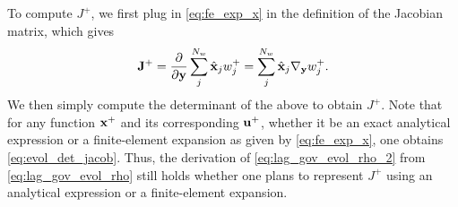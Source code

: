 \documentclass[11pt]{report}
\begin{document}
To compute $J^+$, we first plug in \cref{eq:fe_exp_x} in the definition of the Jacobian matrix, which gives
\begin{equation}
    \mathbf{J}^+ = \frac{\partial}{\partial \mathbf{y}} \sum_j^{N_w} \hat{\mathbf{x}}_j w^+_j = \sum_j^{N_w} \hat{\mathbf{x}}_j \nabla_{\mathbf{y}} w^+_j.
\end{equation}
We then simply compute the determinant of the above to obtain $J^+$. Note that for any function $\mathbf{x}^+$ and its corresponding $\mathbf{u}^+$, whether it be an exact analytical expression or a finite-element expansion as given by \cref{eq:fe_exp_x}, one obtains \cref{eq:evol_det_jacob}. Thus, the derivation of \cref{eq:lag_gov_evol_rho_2} from \cref{eq:lag_gov_evol_rho} still holds whether one plans to represent $J^+$ using an analytical expression or a finite-element expansion. 

\end{document}
